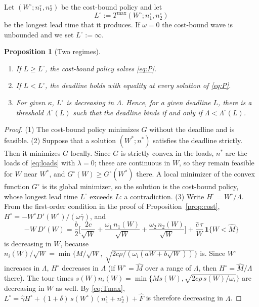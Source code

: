 \documentclass[10pt, reqno]{amsart}
\newtheorem{proposition}{Proposition}
\theoremstyle{definition}
\begin{document}
Let $(W^\circ;n_1^\circ,n_2^\circ)$ be the cost-bound policy and let
\begin{equation}\label{eq:L0}
L^\circ:=T^{\max}(W^\circ;n_1^\circ,n_2^\circ)
\end{equation}
be the longest lead time that it produces. If $\omega=0$ the cost-bound wave is unbounded and we set $L^\circ:=\infty$.

\begin{proposition}[Two regimes]\label{prop:regimes}
\begin{enumerate}
\item If $L\ge L^\circ$, the cost-bound policy solves \eqref{eq:P}.
\item If $L<L^\circ$, the deadline holds with equality at every solution of \eqref{eq:P}.
\item For given $\kappa$, $L^\circ$ is decreasing in $\Lambda$. Hence, for a given deadline $L$, there is a threshold $\Lambda^\circ(L)$ such that the deadline binds if and only if $\Lambda<\Lambda^\circ(L)$.
\end{enumerate}
\end{proposition}

\begin{proof}
(1) The cost-bound policy minimizes $G$ without the deadline and is feasible. (2) Suppose that a solution $(W^*;n^*)$ satisfies the deadline strictly. Then it minimizes $G$ locally. Since $G$ is strictly convex in the loads, $n^*$ are the loads of \eqref{eq:loads} with $\lambda=0$; these are continuous in $W$, so they remain feasible for $W$ near $W^*$, and $G^\circ(W)\ge G^\circ(W^*)$ there. A local minimizer of the convex function $G^\circ$ is its global minimizer, so the solution is the cost-bound policy, whose longest lead time $L^\circ$ exceeds $L$: a contradiction. (3) Write $H^\circ=W^\circ/\Lambda$. From the first-order condition in the proof of Proposition~\ref{prop:cost}, $H^\circ=-W^\circ D'(W^\circ)/(\omega\bar\gamma)$, and
\[
-W\,D'(W)=\frac b2\Big[\frac{2c}{\sqrt W}+\frac{\omega_1\,n_1(W)}{\sqrt W}+\frac{\omega_2\,n_2(W)}{\sqrt W}\Big]+\frac{\hat c\,\tau}{W}\,\mathbf 1\{W<\hat M\}
\]
is decreasing in $W$, because $n_i(W)/\sqrt W=\min\{M/\sqrt W,\ \sqrt{2c\rho/(\omega_i(aW+b\sqrt W))}\}$ is. Since $W^\circ$ increases in $\Lambda$, $H^\circ$ decreases in $\Lambda$ (if $W^\circ=\hat M$ over a range of $\Lambda$, then $H^\circ=\hat M/\Lambda$ there). The tour times $s(W)n_i(W)=\min\{Ms(W),\sqrt{2c\rho\,s(W)/\omega_i}\}$ are decreasing in $W$ as well. By \eqref{eq:Tmax}, $L^\circ=\hat\gamma H^\circ+(1+\delta)\,s(W^\circ)(n_1^\circ+n_2^\circ)+\hat F$ is therefore decreasing in $\Lambda$.
\end{proof}
\end{document}
